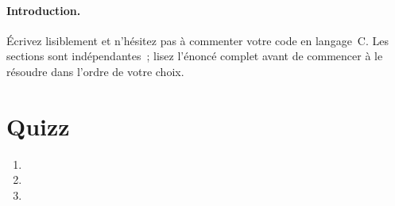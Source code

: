 \documentclass[ds]{sujet}
\begin{document}
\formation{} 
\matiere{}  
\auteur{} 
\paragraph{Introduction.}
\'Ecrivez lisiblement et n'h\'esitez pas \`a commenter votre code en
langage~C. Les sections sont ind\'ependantes~; lisez l'\'enonc\'e
complet avant de commencer \`a le r\'esoudre dans l'ordre de votre
choix.
\section{Quizz}
\begin{enumerate}
\item
\item
\item
\end{enumerate}



\end{document}
